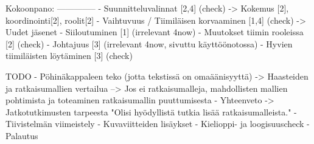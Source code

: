 Kokoonpano:
--------------
- Suunnitteluvalinnat                       [2,4] (check)
    -> Kokemus [2], koordinointi[2], roolit[2]
- Vaihtuvuus / Tiimiläisen korvaaminen      [1,4] (check)
    -> Uudet jäsenet
- Siiloutuminen                             [1] (irrelevant 4now)
- Muutokset tiimin rooleissa                [2] (check)
- Johtajuus                                 [3] (irrelevant 4now, sivuttu käyttöönotossa)
- Hyvien tiimiläisten löytäminen            [3] (check)

    TODO    
- Pöhinäkappaleen teko (jotta tekstissä on omaäänisyyttä)
-> Haasteiden ja ratkaisumallien vertailua
--> Jos ei ratkaisumalleja, mahdollisten mallien pohtimista ja toteaminen ratkaisumallin puuttumisesta
- Yhteenveto
-> Jatkotutkimusten tarpeesta "Olisi hyödyllistä tutkia lisää ratkaisumalleista."
- Tiivistelmän viimeistely
- Kuvaviitteiden lisäykset
- Kielioppi- ja loogisuuscheck
- Palautus
